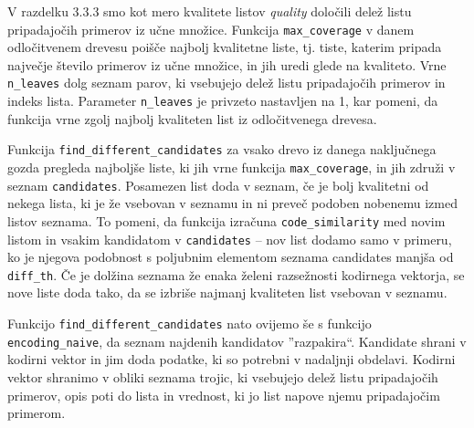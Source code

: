 \documentclass[12pt,a4paper,twoside]{article}
\theoremstyle{definition} %
\theoremstyle{plain} %
\numberwithin{equation}{section}  %
\begin{document}
V razdelku 3.3.3 smo kot mero kvalitete listov \textit{quality} določili delež listu pripadajočih primerov iz učne množice. 
Funkcija \texttt{max\_\-coverage} v danem odločitvenem drevesu poišče najbolj kvalitetne liste, tj. tiste, katerim pripada največje število primerov iz učne množice, in jih uredi glede na kvaliteto.
Vrne \texttt{n\_\-leaves} dolg seznam parov, ki vsebujejo delež listu pripadajočih primerov in indeks lista. 
Parameter \texttt{n\_\-leaves} je privzeto nastavljen na 1, kar pomeni, da funkcija vrne zgolj najbolj kvaliteten list iz odločitvenega drevesa.

Funkcija \texttt{find\_\-different\_\-candidates} za vsako drevo iz danega naključnega gozda pregleda najboljše liste, ki jih vrne funkcija \texttt{max\_\-coverage}, in jih združi v seznam \texttt{candidates}.
Posamezen list doda v seznam, če je bolj kvalitetni od nekega lista, ki je že vsebovan v seznamu in ni preveč podoben nobenemu izmed listov seznama.
To pomeni, da funkcija izračuna \texttt{code\_similarity} med novim listom in vsakim kandidatom v \texttt{candidates} -- nov list dodamo samo v primeru, ko je njegova podobnost s poljubnim elementom seznama candidates manjša od \texttt{diff\_th}.
Če je dolžina seznama že enaka želeni razsežnosti kodirnega vektorja, se nove liste doda tako, da se izbriše najmanj kvaliteten list vsebovan v seznamu.

Funkcijo \texttt{find\_\-different\_\-candidates} nato ovijemo še s funkcijo \texttt{encoding\_\-naive}, da seznam najdenih kandidatov ''razpakira``.
Kandidate shrani v kodirni vektor in jim doda podatke, ki so potrebni v nadaljnji obdelavi. %
Kodirni vektor shranimo v obliki seznama trojic, ki vsebujejo delež listu pripadajočih primerov, opis poti do lista in vrednost, ki jo list napove njemu pripadajočim primerom.




\end{document}
